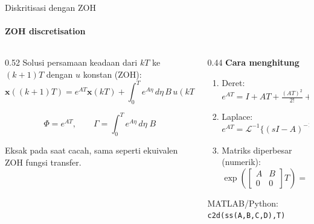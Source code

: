 \documentclass[aspectratio=169,10pt]{beamer}
\begin{document}
\begin{frame}{Diskritisasi dengan ZOH}
	\framesubtitle{ZOH discretisation}
	\begin{columns}[T]
		\begin{column}{0.52\textwidth}
			\small
			Solusi persamaan keadaan dari $kT$ ke $(k+1)T$ dengan $u$ konstan (ZOH):
			\[
				\mathbf{x}((k+1)T) = e^{AT}\mathbf{x}(kT) + \int_0^T e^{A\eta}\,d\eta\,B\,u(kT)
			\]
			\begin{block}{}
				\[
					\Phi = e^{AT},\qquad \Gamma = \int_0^T e^{A\eta}\,d\eta\;B
				\]
			\end{block}
			Eksak pada saat cacah, sama seperti ekuivalen ZOH fungsi transfer.
		\end{column}
		\begin{column}{0.44\textwidth}
			\small
			\textbf{Cara menghitung}
			\begin{enumerate}
				\item Deret: $e^{AT} = I + AT + \frac{(AT)^2}{2!} + \cdots$
				\item Laplace: $e^{AT} = \mathcal{L}^{-1}\{(sI-A)^{-1}\}\big|_{t=T}$
				\item Matriks diperbesar (numerik):
				\[
					\exp\!\left(\begin{bmatrix} A & B\\ 0 & 0\end{bmatrix}T\right) = \begin{bmatrix}\Phi & \Gamma\\ 0 & I\end{bmatrix}
				\]
			\end{enumerate}
			{\scriptsize MATLAB/Python: \texttt{c2d(ss(A,B,C,D),T)}}
		\end{column}
	\end{columns}
\end{frame}
\end{document}
